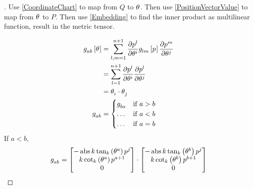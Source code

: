 \documentclass[stu, babel, american, biblatex, a4paper, draftall]{apa7}
\begin{document}
\begin{proof}[]
    \skipped

    Use \cref{CoordinateChart} to map from $Q$ to $\tensor{\theta}{}$.
    Then use \cref{PositionVectorValue} to map from $\tensor{\theta}{}$ to $P$.
    Then use \cref{Embedding} to find the inner product as multilinear function, result in the metric tensor.
    
    \begin{align*}
        \tensor{g}{_a_b}\left[\tensor{\theta}{}\right]
        & = \sum_{l,m=1}^{n+1}{
            \frac{\partial{\tensor{p}{^l}}}{\partial{\tensor{\theta}{^i}}}
            \tensor{g}{_l_m}\left[\tensor{p}{}\right]
            \frac{\partial{\tensor{p}{^m}}}{\partial{\tensor{\theta}{^j}}}
        } \\
        & = \sum_{l=1}^{n+1}{
            \frac{\partial{\tensor{p}{^l}}}{\partial{\tensor{\theta}{^i}}}
            \frac{\partial{\tensor{p}{^l}}}{\partial{\tensor{\theta}{^j}}}
        } \\
        & = \tensor{\theta}{_i}\cdot\tensor{\theta}{_j} \\
        \tensor{g}{_a_b}
        & = \begin{cases}
            \tensor{g}{_b_a} & \text{if $a>b$} \\
            \dots & \text{if $a<b$} \\
            \dots & \text{if $a=b$}
        \end{cases}
    \end{align*}
    If $a<b$,
    \begin{align*}
        \tensor{g}{_a_b}
        &=\begin{bmatrix}
            -\abs{k}\tan_k\left(\tensor{\theta}{^a}\right)\tensor{p}{^j} \\
            k\cot_k\left(\tensor{\theta}{^a}\right)\tensor{p}{^{a+1}}          \\
            0                                           \\
        \end{bmatrix}\cdot\begin{bmatrix}
            -\abs{k}\tan_k\left(\tensor{\theta}{^b}\right)\tensor{p}{^j} \\
            k\cot_k\left(\tensor{\theta}{^b}\right)\tensor{p}{^{b+1}}          \\
            0                                           \\
        \end{bmatrix} \\

\end{align*}
\end{proof}
\end{document}
